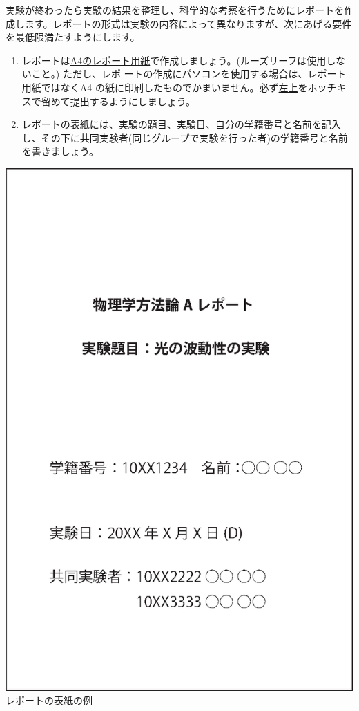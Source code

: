 実験が終わったら実験の結果を整理し、科学的な考察を行うためにレポートを作成します。レポートの形式は実験の内容によって異なりますが、次にあげる要件を最低限満たすようにします。\\
\begin{minipage}[t]{9.5cm}
\begin{enumerate}
\item
レポートは\underline{A4のレポート用紙}で作成しましょう。(ルーズリーフは使用しないこと。) ただし、レポ ートの作成にパソコンを使用する場合は、レポート用紙ではなくA4 の紙に印刷したものでかまいません。必ず\underline{左上}をホッチキスで留めて提出するようにしましょう。

\item レポートの表紙には、実験の題目、実験日、自分の学籍番号と名前を記入し、その下に共同実験者(同じグループで実験を行った者)の学籍番号と名前を書きましょう。
\end{enumerate}
\end{minipage}
\hspace*{1cm}
\begin{minipage}[t]{5cm}
\begin{center}
\vspace*{-0.3cm}
\includegraphics[scale=0.4]{00_Intro/report.eps}\\
レポートの表紙の例
\end{center}
\end{minipage}

